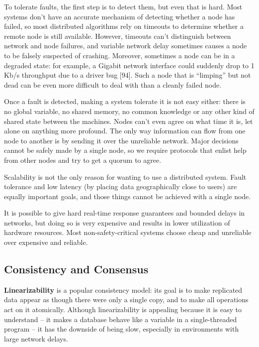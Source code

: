 \documentclass{article}
\begin{document}
    To tolerate faults, the first step is to detect them, but even that is hard. Most systems don’t have an accurate mechanism of detecting whether a node has failed, so most distributed algorithms rely on timeouts to determine whether a remote node is still available. However, timeouts can’t distinguish between network and node failures, and variable network delay sometimes causes a node to be falsely suspected of crashing. Moreover, sometimes a node can be in a degraded state: for example, a Gigabit network interface could suddenly drop to 1 Kb/s throughput due to a driver bug [94]. Such a node that is ``limping” but not dead can be even more difficult to deal with than a cleanly failed node.
    
    Once a fault is detected, making a system tolerate it is not easy either: there is no global variable, no shared memory, no common knowledge or any other kind of shared state between the machines. Nodes can’t even agree on what time it is, let alone on anything more profound. The only way information can flow from one node to another is by sending it over the unreliable network. Major decisions cannot be safely made by a single node, so we require protocols that enlist help from other nodes and try to get a quorum to agree.
    
    Scalability is not the only reason for wanting to use a distributed system. Fault tolerance and low latency (by placing data geographically close to users) are equally important goals, and those things cannot be achieved with a single node.
    
    It is possible to give hard real-time response guarantees and bounded delays in networks, but doing so is very expensive and results in lower utilization of hardware resources. Most non-safety-critical systems choose cheap and unreliable over expensive and reliable.
    
    \subsection{Consistency and Consensus }
    \textbf{Linearizability} is a popular consistency model: its goal is to make replicated data appear as though there were only a single copy, and to make all operations act on it atomically. Although linearizability is appealing because it is easy to understand -- it makes a database behave like a variable in a single-threaded program -- it has the downside of being slow, especially in environments with large network delays.
    
\end{document}
